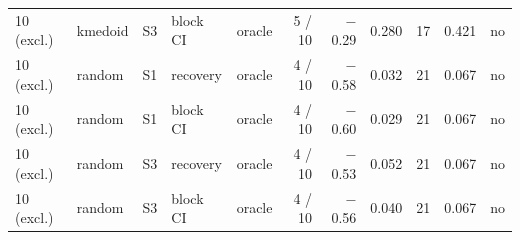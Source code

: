 \begin{tabular}{lllllrrrrrl}
10 (excl.) & kmedoid & S3 & block CI & oracle & 5 / 10 & $-$0.29 & 0.280 & 17 & 0.421 & no \\
10 (excl.) & random & S1 & recovery & oracle & 4 / 10 & $-$0.58 & 0.032 & 21 & 0.067 & no \\
10 (excl.) & random & S1 & block CI & oracle & 4 / 10 & $-$0.60 & 0.029 & 21 & 0.067 & no \\
10 (excl.) & random & S3 & recovery & oracle & 4 / 10 & $-$0.53 & 0.052 & 21 & 0.067 & no \\
10 (excl.) & random & S3 & block CI & oracle & 4 / 10 & $-$0.56 & 0.040 & 21 & 0.067 & no \\
\bottomrule
\end{tabular}
